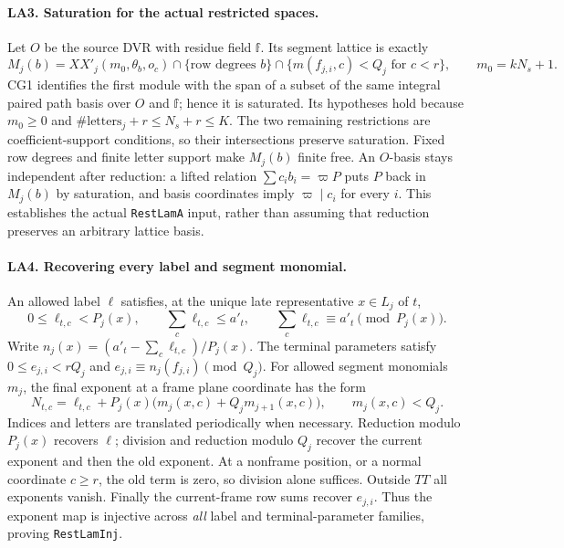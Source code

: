 \paragraph{LA3. Saturation for the actual restricted spaces.}
Let $O$ be the source DVR with residue field $\mathbb f$.
Its segment lattice is exactly
\[
 M_j(b)=XX'_j(m_0,\theta_b,o_c)
 \cap\{\text{row degrees }b\}
 \cap\{m(f_{j,i},c)<Q_j\text{ for }c<r\},
 \qquad m_0=kN_s+1.
\]
CG1 identifies the first module with the span of a subset of the same integral paired path basis over $O$ and $\mathbb f$; hence it is saturated.
Its hypotheses hold because $m_0\ge0$ and
$\#\mathrm{letters}_j+r\le N_s+r\le K$.
The two remaining restrictions are coefficient-support conditions, so their intersections preserve saturation.
Fixed row degrees and finite letter support make $M_j(b)$ finite free.
An $O$-basis stays independent after reduction: a lifted relation
$\sum c_i b_i=\varpi P$ puts $P$ back in $M_j(b)$ by saturation, and basis coordinates imply $\varpi\mid c_i$ for every $i$.
This establishes the actual \texttt{RestLamA} input, rather than assuming that reduction preserves an arbitrary lattice basis.

\paragraph{LA4. Recovering every label and segment monomial.}
An allowed label $\ell$ satisfies, at the unique late representative $x\in L_j$ of $t$,
\[
 0\le\ell_{t,c}<P_j(x),\qquad
 \sum_c\ell_{t,c}\le a'_t,\qquad
 \sum_c\ell_{t,c}\equiv a'_t\pmod{P_j(x)}.
\]
Write $n_j(x)=(a'_t-\sum_c\ell_{t,c})/P_j(x)$.
The terminal parameters satisfy $0\le e_{j,i}<rQ_j$ and
$e_{j,i}\equiv n_j(f_{j,i})\pmod{Q_j}$.
For allowed segment monomials $m_j$, the final exponent at a frame plane coordinate has the form
\[
 N_{t,c}=\ell_{t,c}+P_j(x)\bigl(m_j(x,c)+Q_jm_{j+1}(x,c)\bigr),
 \qquad m_j(x,c)<Q_j. \tag{LA.3}
\]
Indices and letters are translated periodically when necessary.
Reduction modulo $P_j(x)$ recovers $\ell$; division and reduction modulo $Q_j$ recover the current exponent and then the old exponent.
At a nonframe position, or a normal coordinate $c\ge r$, the old term is zero, so division alone suffices.
Outside $TT$ all exponents vanish.
Finally the current-frame row sums recover $e_{j,i}$.
Thus the exponent map is injective across \emph{all} label and terminal-parameter families, proving \texttt{RestLamInj}.

